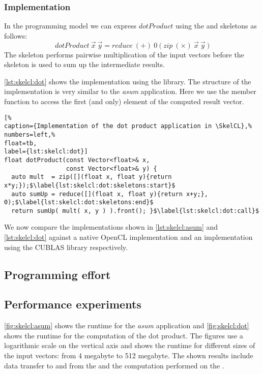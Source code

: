 \subsubsection*{\SkelCL Implementation}
In the \SkelCL programming model we can express $dotProduct$ using the \zip and \reduce skeletons as follows:
\begin{equation}
  dotProduct\ \vec{x}\ \vec{y} = reduce\ (+)\ 0\ \big(\ zip\ (\times)\ \vec{x}\ \vec{y}\ \big)
\end{equation}
The \zip skeleton performs pairwise multiplication of the input vectors before the \reduce skeleton is used to sum up the intermediate results.

\autoref{lst:skelcl:dot} shows the implementation using the \SkelCL library.
The structure of the implementation is very similar to the \emph{asum} application.
Here we use the  member function to access the first (and only) element of the computed result vector.

\begin{lstlisting}[%                                                             
caption={Implementation of the dot product application in \SkelCL},%
numbers=left,%
float=tb,
label={lst:skelcl:dot}]
float dotProduct(const Vector<float>& x,
                 const Vector<float>& y) {
  auto mult  = zip([](float x, float y){return x*y;});$\label{lst:skelcl:dot:skeletons:start}$
  auto sumUp = reduce([](float x, float y){return x+y;}, 0);$\label{lst:skelcl:dot:skeletons:end}$
  return sumUp( mult( x, y ) ).front(); }$\label{lst:skelcl:dot:call}$
\end{lstlisting}





\bigskip

We now compare the \SkelCL implementations shown in \autoref{lst:skelcl:asum} and \autoref{lst:skelcl:dot} against a native OpenCL implementation and an implementation using the CUBLAS library respectively.


\subsection*{Programming effort}

\subsection*{Performance experiments}
\autoref{fig:skelcl:asum} shows the runtime for the \emph{asum} application and \autoref{fig:skelcl:dot} shows the runtime for the computation of the dot product.
The figures use a logarithmic scale on the vertical axis and shows the runtime for different sizes of the input vectors: from 4 megabyte to 512 megabyte.
The shown results include data transfer to and from the \GPU and the computation performed on the \GPU.

